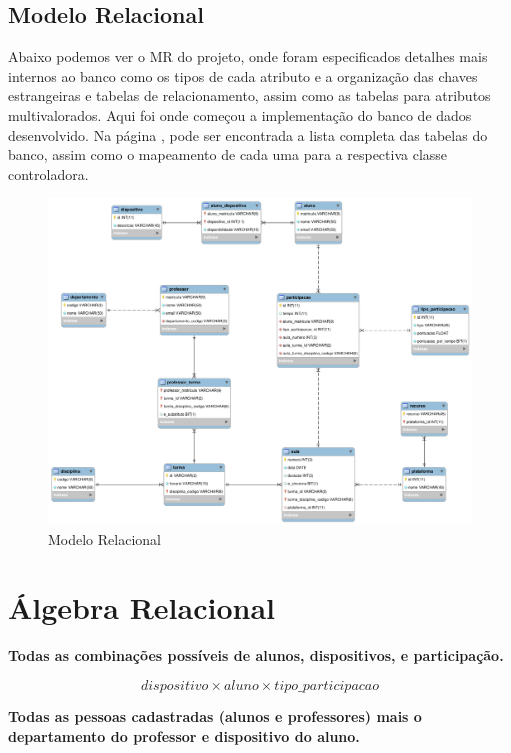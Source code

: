 \documentclass[12pt]{article}
\begin{document}
\newpage

\subsection*{Modelo Relacional}
Abaixo podemos ver o MR do projeto, onde foram especificados detalhes mais internos ao banco como os tipos de cada atributo e a organização das chaves estrangeiras e tabelas de relacionamento, assim como as tabelas para atributos multivalorados. Aqui foi onde começou a implementação do banco de dados desenvolvido. Na página \pageref{mapeamento-controller}, pode ser encontrada a lista completa das tabelas do banco, assim como o mapeamento de cada uma para a respectiva classe controladora.

\begin{figure}[H]
	\centering
    \includegraphics[width=1\textwidth]{MR.png}
    \caption{Modelo Relacional}
\end{figure}

\section*{Álgebra Relacional}
\textbf{Todas as combinações possíveis de alunos, dispositivos, e participação.}

\begin{equation}
    dispositivo \times aluno \times tipo\_participacao
\end{equation}

\noindent \textbf{Todas as pessoas cadastradas (alunos e professores) mais o departamento do professor e dispositivo do aluno.}
\end{document}
